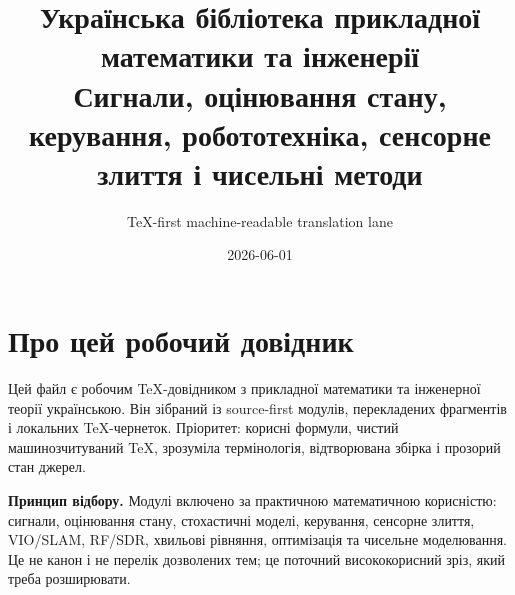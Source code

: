 \documentclass[11pt,a4paper,oneside]{book}
\title{Українська бібліотека прикладної математики та інженерії\\\large Сигнали, оцінювання стану, керування, робототехніка, сенсорне злиття і чисельні методи}
\author{TeX-first machine-readable translation lane}
\date{2026-06-01}
\begin{document}
\pagestyle{plain}
\frontmatter
\maketitle

\chapter*{Про цей робочий довідник}
Цей файл є робочим TeX-довідником з прикладної математики та інженерної теорії українською. Він зібраний із source-first модулів, перекладених фрагментів і локальних TeX-чернеток. Пріоритет: корисні формули, чистий машинозчитуваний TeX, зрозуміла термінологія, відтворювана збірка і прозорий стан джерел.

\medskip
\noindent\textbf{Принцип відбору.} Модулі включено за практичною математичною корисністю: сигнали, оцінювання стану, стохастичні моделі, керування, сенсорне злиття, VIO/SLAM, RF/SDR, хвильові рівняння, оптимізація та чисельне моделювання. Це не канон і не перелік дозволених тем; це поточний висококорисний зріз, який треба розширювати.

\tableofcontents

\mainmatter
\end{document}
